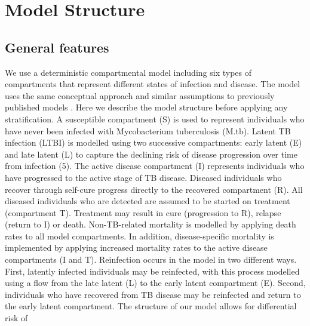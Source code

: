 
\section{Model Structure}

\subsection{General features}

We use a deterministic compartmental model including six types of compartments that represent 
different states of infection and disease. The model uses the same conceptual approach and similar 
assumptions to previously published models \cite{trauer-2016,trauer-2017, ragonnet-2019,ragonnet-2021,ragonnet-2022}. 
Here we describe the model structure before applying any stratification. 
\newline
A susceptible compartment (S) is used to represent individuals who have 
never been infected with Mycobacterium tuberculosis (M.tb). Latent TB infection (LTBI) is modelled 
using two successive compartments: early latent (E) and late latent (L) to capture the declining risk of 
disease progression over time from infection (5). The active disease compartment (I) represents 
individuals who have progressed to the active stage of TB disease. Diseased individuals who recover 
through self-cure progress directly to the recovered compartment (R). All diseased individuals who 
are detected are assumed to be started on treatment (compartment T). Treatment may result in cure 
(progression to R), relapse (return to I) or death.
\newline
Non-TB-related mortality is modelled by applying death rates to all model compartments. In addition, 
disease-specific mortality is implemented by applying increased mortality rates to the active disease 
compartments (I and T).
\newline
Reinfection occurs in the model in two different ways. First, latently infected individuals may be 
reinfected, with this process modelled using a flow from the late latent (L) to the early latent 
compartment (E). Second, individuals who have recovered from TB disease may be reinfected and 
return to the early latent compartment. The structure of our model allows for differential risk of 
